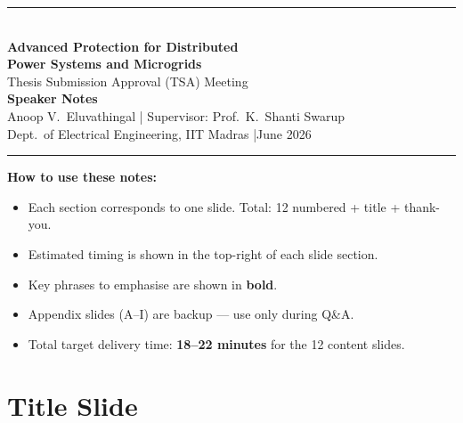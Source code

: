 \documentclass[12pt, a4paper]{article}
\begin{document}
\begin{center}
  {\color{iitmMaroon}\rule{\linewidth}{2pt}}\\[0.5cm]
  {\LARGE\bfseries\color{iitmMaroon}
    Advanced Protection for Distributed\\[0.2cm]
    Power Systems and Microgrids}\\[0.4cm]
  {\large Thesis Submission Approval (TSA) Meeting}\\[0.3cm]
  {\large\bfseries Speaker Notes}\\[0.5cm]
  {\normalsize Anoop V.\ Eluvathingal \quad|\quad
               Supervisor: Prof.\ K.\ Shanti Swarup}\\[0.1cm]
  {\normalsize Dept.\ of Electrical Engineering, IIT Madras \quad|\quad June 2026}\\[0.5cm]
  {\color{iitmMaroon}\rule{\linewidth}{2pt}}
\end{center}

\vspace{0.3cm}
\begin{tcolorbox}[colback=iitmMaroon!8, colframe=iitmMaroon, arc=3pt,
                  boxrule=0.8pt, left=8pt, right=8pt, top=6pt, bottom=6pt]
  \small
  \textbf{How to use these notes:}
  \begin{itemize}[leftmargin=1.5em, itemsep=2pt, topsep=3pt]
    \item Each section corresponds to one slide. Total: 12 numbered + title + thank-you.
    \item Estimated timing is shown in the top-right of each slide section.
    \item Key phrases to emphasise are shown in \textbf{bold}.
    \item Appendix slides (A--I) are backup --- use only during Q\&A.
    \item Total target delivery time: \textbf{18--22 minutes} for the 12 content slides.
  \end{itemize}
\end{tcolorbox}

\newpage
\tableofcontents
\newpage

\section{Title Slide}
\end{document}
